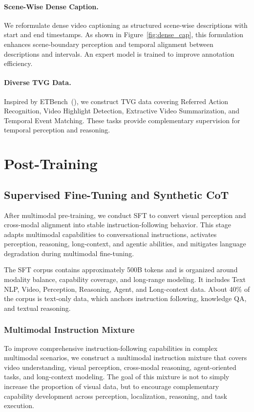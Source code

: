 \documentclass{article} %
\begin{document}
\paragraph{Scene-Wise Dense Caption.}
We reformulate dense video captioning as structured scene-wise descriptions with start and end timestamps. As shown in Figure~\ref{fig:dense_cap}, this formulation enhances scene-boundary perception and temporal alignment between descriptions and intervals. An expert model is trained to improve annotation efficiency.

\paragraph{Diverse TVG Data.}
Inspired by ETBench~(\cite{etbench}), we construct TVG data covering Referred Action Recognition, Video Highlight Detection, Extractive Video Summarization, and Temporal Event Matching. These tasks provide complementary supervision for temporal perception and reasoning.

\section{Post-Training}

\subsection{Supervised Fine-Tuning and Synthetic CoT}

After multimodal pre-training, we conduct SFT to convert visual perception and cross-modal alignment into stable instruction-following behavior. This stage adapts multimodal capabilities to conversational instructions, activates perception, reasoning, long-context, and agentic abilities, and mitigates language degradation during multimodal fine-tuning.

The SFT corpus contains approximately 500B tokens and is organized around modality balance, capability coverage, and long-range modeling. It includes Text NLP, Video, Perception, Reasoning, Agent, and Long-context data. About 40\% of the corpus is text-only data, which anchors instruction following, knowledge QA, and textual reasoning.

\subsubsection{Multimodal Instruction Mixture}

To improve comprehensive instruction-following capabilities in complex multimodal scenarios, we construct a multimodal instruction mixture that covers video understanding, visual perception, cross-modal reasoning, agent-oriented tasks, and long-context modeling. The goal of this mixture is not to simply increase the proportion of visual data, but to encourage complementary capability development across perception, localization, reasoning, and task execution.
\end{document}
